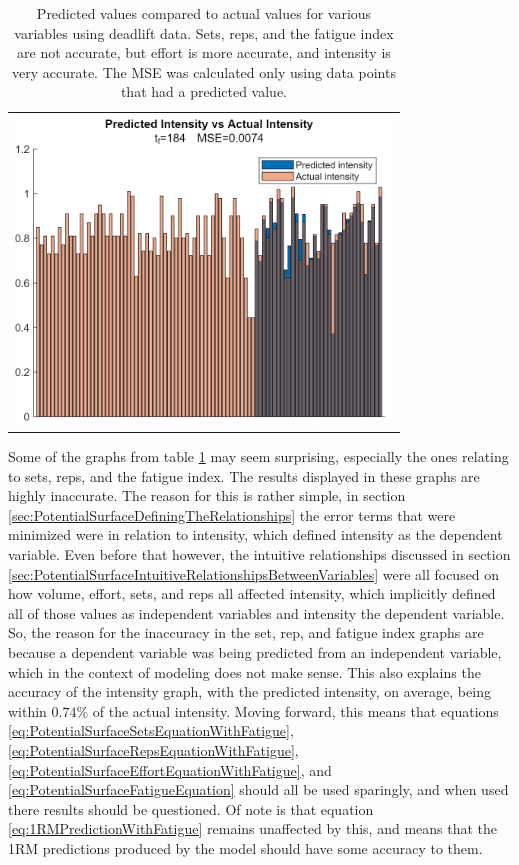 \begin{table}
\begin{tabular}{c|c}
        \multicolumn{2}{c}{
            \includegraphics[width=100mm]{ActualVsPredValues/ActualVsPredIntensity.png}
        }
    \end{tabular}
    \caption{Predicted values compared to actual values for various variables using deadlift data. Sets, reps, and the fatigue index are not accurate, but effort is more accurate, and intensity is very accurate. The MSE was calculated only using data points that had a predicted value.}
    \label{tab:PredictionsVsActualConstantTimeFrame}
\end{table}

Some of the graphs from table \ref{tab:PredictionsVsActualConstantTimeFrame} may seem surprising, especially the ones relating to sets, reps, and the fatigue index. The results displayed in these graphs are highly inaccurate. The reason for this is rather simple, in section \ref{sec:PotentialSurfaceDefiningTheRelationships} the error terms that were minimized were in relation to intensity, which defined intensity as the dependent variable. Even before that however, the intuitive relationships discussed in section \ref{sec:PotentialSurfaceIntuitiveRelationshipsBetweenVariables} were all focused on how volume, effort, sets, and reps all affected intensity, which implicitly defined all of those values as independent variables and intensity the dependent variable. So, the reason for the inaccuracy in the set, rep, and fatigue index graphs are because a dependent variable was being predicted from an independent variable, which in the context of modeling does not make sense. This also explains the accuracy of the intensity graph, with the predicted intensity, on average, being within $0.74\%$ of the actual intensity. Moving forward, this means that equations \ref{eq:PotentialSurfaceSetsEquationWithFatigue}, \ref{eq:PotentialSurfaceRepsEquationWithFatigue}, \ref{eq:PotentialSurfaceEffortEquationWithFatigue}, and \ref{eq:PotentialSurfaceFatigueEquation} should all be used sparingly, and when used there results should be questioned. Of note is that equation \ref{eq:1RMPredictionWithFatigue} remains unaffected by this, and means that the 1RM predictions produced by the model should have some accuracy to them.

